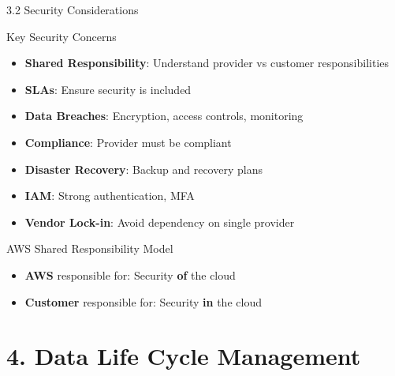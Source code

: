 \documentclass{beamer}
\begin{document}
	\begin{frame}{3.2 Security Considerations}
		\begin{block}{Key Security Concerns}
			\begin{itemize}
				\item \textbf{Shared Responsibility}: Understand provider vs customer responsibilities
				\item \textbf{SLAs}: Ensure security is included
				\item \textbf{Data Breaches}: Encryption, access controls, monitoring
				\item \textbf{Compliance}: Provider must be compliant
				\item \textbf{Disaster Recovery}: Backup and recovery plans
				\item \textbf{IAM}: Strong authentication, MFA
				\item \textbf{Vendor Lock-in}: Avoid dependency on single provider
			\end{itemize}
		\end{block}
		
		\begin{exampleblock}{AWS Shared Responsibility Model}
			\begin{itemize}
				\item \textbf{AWS} responsible for: Security \textbf{of} the cloud
				\item \textbf{Customer} responsible for: Security \textbf{in} the cloud
			\end{itemize}
		\end{exampleblock}
	\end{frame}
	
	\section{4. Data Life Cycle Management}
	
\end{document}
